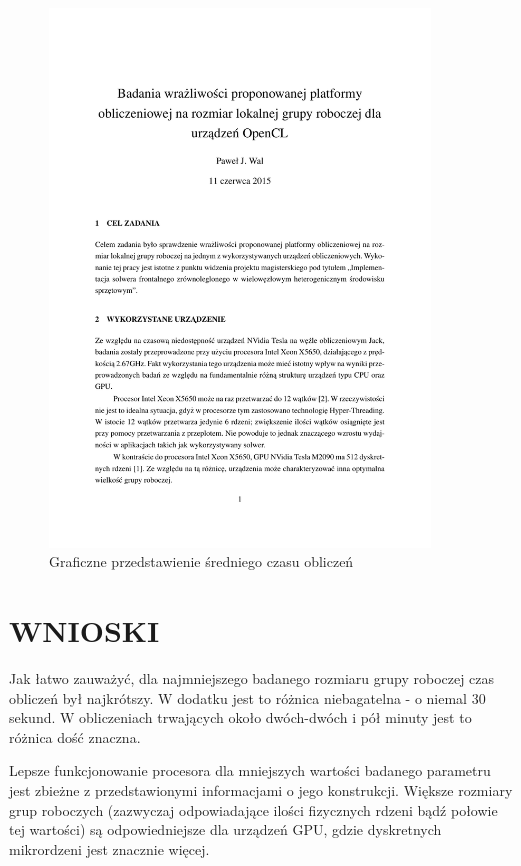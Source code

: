 \documentclass[12pt,a4paper,twoside]{article}
\begin{document}
\begin{figure}
  \centering
    \includegraphics[width=0.9\textwidth]{lws}
  \caption{Graficzne przedstawienie średniego czasu obliczeń}
  \label{fig:lws}
\end{figure}

\section{WNIOSKI}

Jak łatwo zauważyć, dla najmniejszego badanego rozmiaru grupy roboczej czas obliczeń był najkrótszy. W dodatku jest to różnica niebagatelna - o niemal 30 sekund. W obliczeniach trwających około dwóch-dwóch i pół minuty jest to różnica dość znaczna.

Lepsze funkcjonowanie procesora dla mniejszych wartości badanego parametru jest zbieżne z przedstawionymi informacjami o jego konstrukcji. Większe rozmiary grup roboczych (zazwyczaj odpowiadające ilości fizycznych rdzeni bądź połowie tej wartości) są odpowiedniejsze dla urządzeń GPU, gdzie dyskretnych mikrordzeni jest znacznie więcej.
\end{document}
